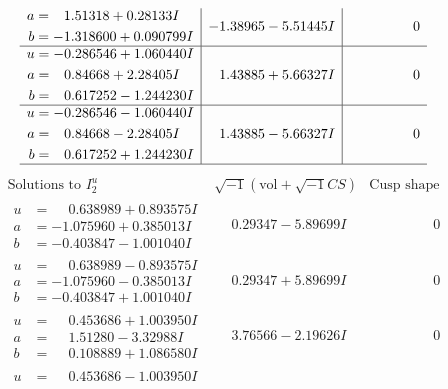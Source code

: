 \documentclass[1p]{elsarticle_modified}
\theoremstyle{definition}
\newcommand{\I}{\sqrt{-1}}
\begin{document}
$$\begin{array}{c|c|c}
\begin{aligned}
a &= \phantom{-}1.51318 + 0.28133 I \\
b &= -1.318600 + 0.090799 I\end{aligned}
 & -1.38965 - 5.51445 I & \phantom{-0.000000 } 0 \\ \hline\begin{aligned}
u &= -0.286546 + 1.060440 I \\
a &= \phantom{-}0.84668 + 2.28405 I \\
b &= \phantom{-}0.617252 - 1.244230 I\end{aligned}
 & \phantom{-}1.43885 + 5.66327 I & \phantom{-0.000000 } 0 \\ \hline\begin{aligned}
u &= -0.286546 - 1.060440 I \\
a &= \phantom{-}0.84668 - 2.28405 I \\
b &= \phantom{-}0.617252 + 1.244230 I\end{aligned}
 & \phantom{-}1.43885 - 5.66327 I & \phantom{-0.000000 } 0\\
 \hline 
 \end{array}$$\newpage$$\begin{array}{c|c|c}  
\text{Solutions to }I^u_{2}& \I (\text{vol} + \sqrt{-1}CS) & \text{Cusp shape}\\
 \hline 
\begin{aligned}
u &= \phantom{-}0.638989 + 0.893575 I \\
a &= -1.075960 + 0.385013 I \\
b &= -0.403847 - 1.001040 I\end{aligned}
 & \phantom{-}0.29347 - 5.89699 I & \phantom{-0.000000 } 0 \\ \hline\begin{aligned}
u &= \phantom{-}0.638989 - 0.893575 I \\
a &= -1.075960 - 0.385013 I \\
b &= -0.403847 + 1.001040 I\end{aligned}
 & \phantom{-}0.29347 + 5.89699 I & \phantom{-0.000000 } 0 \\ \hline\begin{aligned}
u &= \phantom{-}0.453686 + 1.003950 I \\
a &= \phantom{-}1.51280 - 3.32988 I \\
b &= \phantom{-}0.108889 + 1.086580 I\end{aligned}
 & \phantom{-}3.76566 - 2.19626 I & \phantom{-0.000000 } 0 \\ \hline\begin{aligned}
u &= \phantom{-}0.453686 - 1.003950 I \\

\end{aligned}
\end{array}$$
\end{document}
